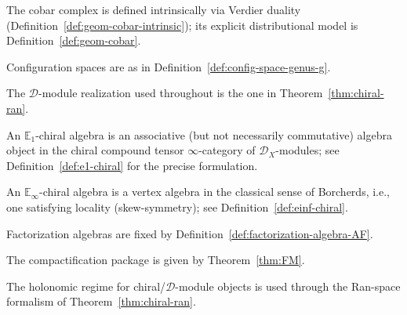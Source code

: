 \begin{definition}\label{def:cobar-coalgebra}
The cobar complex is defined intrinsically via Verdier duality
(Definition~\ref{def:geom-cobar-intrinsic}); its explicit distributional
model is Definition~\ref{def:geom-cobar}.
\end{definition}

\begin{definition}\label{def:config-space}
Configuration spaces are as in Definition~\ref{def:config-space-genus-g}.
\end{definition}

\begin{definition}\label{def:dmod-classical}
The \(\mathcal{D}\)-module realization used throughout is the one in Theorem~\ref{thm:chiral-ran}.
\end{definition}

\begin{definition}\label{def:e1-chiral-algebra}
An \(\mathbb{E}_1\)-chiral algebra is an associative (but not necessarily commutative)
algebra object in the chiral compound tensor \(\infty\)-category of \(\mathcal{D}_X\)-modules;
see Definition~\ref{def:e1-chiral} for the precise formulation.
\end{definition}

\begin{definition}\label{def:einf-chiral-algebra}
An \(\mathbb{E}_\infty\)-chiral algebra is a vertex algebra in the classical sense of Borcherds,
i.e., one satisfying locality (skew-symmetry); see Definition~\ref{def:einf-chiral}.
\end{definition}

\begin{definition}\label{def:factorization-algebra}
Factorization algebras are fixed by Definition~\ref{def:factorization-algebra-AF}.
\end{definition}

\begin{definition}\label{def:fm-compactification}
The compactification package is given by Theorem~\ref{thm:FM}.
\end{definition}

\begin{definition}\label{def:holonomic}
The holonomic regime for chiral/\(\mathcal{D}\)-module objects is used through the Ran-space formalism of Theorem~\ref{thm:chiral-ran}.
\end{definition}

